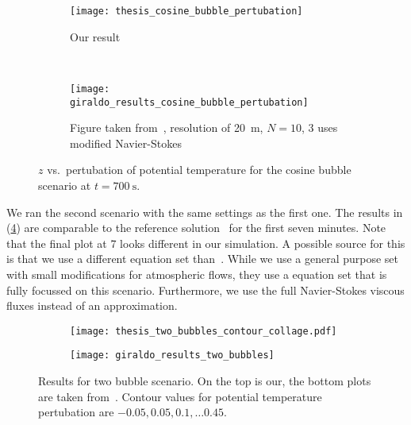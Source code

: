 \begin{figure}[htb]
  \centering
  \begin{subfigure}[t]{0.5\textwidth}
    \centering
    \texttt{[image: thesis\_cosine\_bubble\_pertubation]}
    \caption{\label{fig:cosine-bubble-potT-ours}%
      Our result}
  \end{subfigure}~%
  \begin{subfigure}[t]{0.5\textwidth}
    \centering
    \texttt{[image: giraldo\_results\_cosine\_bubble\_pertubation]}
    \caption{\label{fig:cosine-bubble-potT-giraldo}%
      Figure taken from~\cite{giraldo2008study}, resolution of \SI{20}{\m}, $N = 10$, \dg{}3 uses modified Navier-Stokes} %
  \end{subfigure}
  \caption{\label{fig:cosine-bubble-potT}%
    $z$ vs.\ pertubation of potential temperature for the cosine bubble scenario at $t=\SI{700}{\s}$.
  }
\end{figure}


We ran the second scenario with the same \amr{} settings as the first one.
The results in (\cref{fig:two-bubbles-contour}) are comparable to the reference solution~\cite{muller2010adaptive} for the first seven minutes.
Note that the final plot at \SI{7}{\min} looks different in our simulation.
A possible source for this is that we use a different equation set than~\cite{muller2010adaptive}.
While we use a general purpose set with small modifications for atmospheric flows, they use a equation set that is fully focussed on this scenario.
Furthermore, we use the full Navier-Stokes viscous fluxes instead of an approximation.

\begin{figure}[p]
  \vspace*{-4.5cm}
  \centering
  \begin{subfigure}{1\textwidth}
    \centering
    \texttt{[image: thesis\_two\_bubbles\_contour\_collage.pdf]}
  \end{subfigure}
  \vspace*{1cm}
  \begin{subfigure}[t]{1\textwidth}
    \centering
    \texttt{[image: giraldo\_results\_two\_bubbles]}
  \end{subfigure}
  \caption{\label{fig:two-bubbles-contour}%
    Results for two bubble scenario.
    On the top is our, the bottom plots are taken from~\cite{muller2010adaptive}.
  Contour values for potential temperature pertubation are $-0.05, 0.05, 0.1, \ldots 0.45$.
}
\end{figure}

